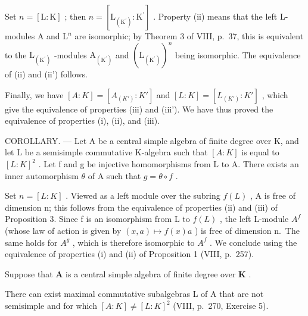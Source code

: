 Set \(n = [\mathrm{L}:\mathrm{K}]\) ; then \(n = [\mathrm{L}_{(\mathrm{K}^{\prime})}:\mathrm{K}^{\prime}]\) . Property (ii) means that the left L-modules A and \(\mathrm{L}^n\) are isomorphic; by Theorem 3 of VIII, p.~37, this is equivalent to the \(\mathrm{L}_{(\mathrm{K}^{\prime})}\) -modules \(\mathrm{A}_{(\mathrm{K}^{\prime})}\) and \((\mathrm{L}_{(\mathrm{K}^{\prime})})^n\) being isomorphic. The equivalence of (ii) and (ii') follows.

Finally, we have \([A:K]=[A_{(K')}:K']\) and \([L:K]=[L_{(K')}:K']\) , which give the equivalence of properties (iii) and (iii'). We have thus proved the equivalence of properties (i), (ii), and (iii).

COROLLARY. --- Let A be a central simple algebra of finite degree over K, and let L be a semisimple commutative K-algebra such that \([A:K]\) is equal to \([L:K]^{2}\) . Let f and g be injective homomorphisms from L to A. There exists an inner automorphism \(\theta\) of A such that \(g = \theta \circ f\) .

Set \(n = [L : K]\) . Viewed as a left module over the subring \(f(L)\) , A is free of dimension n; this follows from the equivalence of properties (ii) and (iii) of Proposition 3. Since f is an isomorphism from L to \(f(L)\) , the left L-module \(A^{f}\) (whose law of action is given by \((x, a) \mapsto f(x)a\) ) is free of dimension n.~The same holds for \(A^{g}\) , which is therefore isomorphic to \(A^{f}\) . We conclude using the equivalence of properties (i) and (ii) of Proposition 1 (VIII, p.~257).

Suppose that \(\mathbf{A}\) is a central simple algebra of finite degree over \(\mathbf{K}\) .

There can exist maximal commutative subalgebras L of A that are not semisimple and for which \([A:K]\neq[L:K]^{2}\) (VIII, p.~270, Exercise 5).

